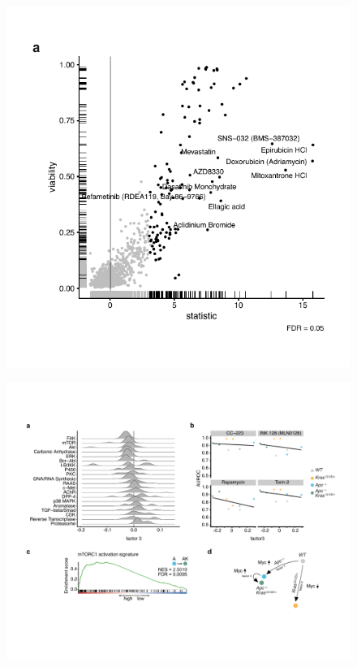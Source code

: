 \begin{flushleft}
\begin{figure}[h]
\centering
\includegraphics[width=\textwidth,
                height=\textheight,
                keepaspectratio]{figures/adenomaprofiling/pdf/fig_3_3.pdf}
\caption{}
\label{fig_180}
\end{figure}
\bigbreak

\begin{figure}[h]
\centering
\includegraphics[width=\textwidth,
                height=\textheight,
                keepaspectratio]{figures/adenomaprofiling/pdf/fig_4_1.pdf}
\caption{}
\label{fig_180}
\end{figure}
\bigbreak


\end{flushleft}
